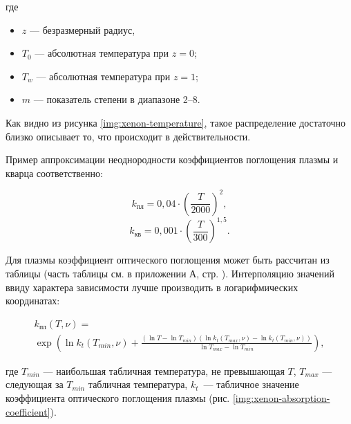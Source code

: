 \noindent где
\begin{itemize}
	\item $z$ — безразмерный радиус,
	\item $T_0$ — абсолютная температура при $z = 0$;
	\item $T_w$ — абсолютная температура при $z = 1$;
	\item $m$ — показатель степени в диапазоне 2–8.
\end{itemize}



Как видно из рисунка \ref{img:xenon-temperature}, такое распределение достаточно близко описывает то, что происходит в действительности.

Пример аппроксимации неоднородности коэффициентов поглощения плазмы и кварца соответственно:

\begin{equation}
	\label{eqn:absorption-coefficient-plasma}
	k_{\text{пл}} = 0,04 \cdot \left(\frac{T}{2000}\right)^2,
\end{equation}
\begin{equation}
	\label{eqn:absorption-coefficient-quartz}
	k_{\text{кв}} = 0,001 \cdot \left(\frac{T}{300}\right)^{1,5}.
\end{equation}

Для плазмы коэффициент оптического поглощения может быть рассчитан из таблицы (часть таблицы см. в приложении А, стр. \pageref{toc:attachment-a}).
Интерполяцию значений ввиду характера зависимости лучше производить в логарифмических координатах:

\begin{equation}
	\begin{matrix}
		k_{\text{пл}}(T, \nu) = \\
		\exp{\left(\ln{k_t(T_{min}, \nu)} + \frac{(\ln{T} - \ln{T_{min}})(\ln{k_t(T_{max}, \nu)} - \ln{k_t(T_{min}, \nu)})}{\ln{T_{max}} - \ln{T_{min}}}\right)},
	\end{matrix}
\end{equation}

\noindent где $T_{min}$ — наибольшая табличная температура, не превышающая $T$, $T_{max}$ — следующая за $T_{min}$ табличная температура, $k_t$~— табличное значение коэффициента оптического поглощения плазмы (рис. \ref{img:xenon-absorption-coefficient}).

